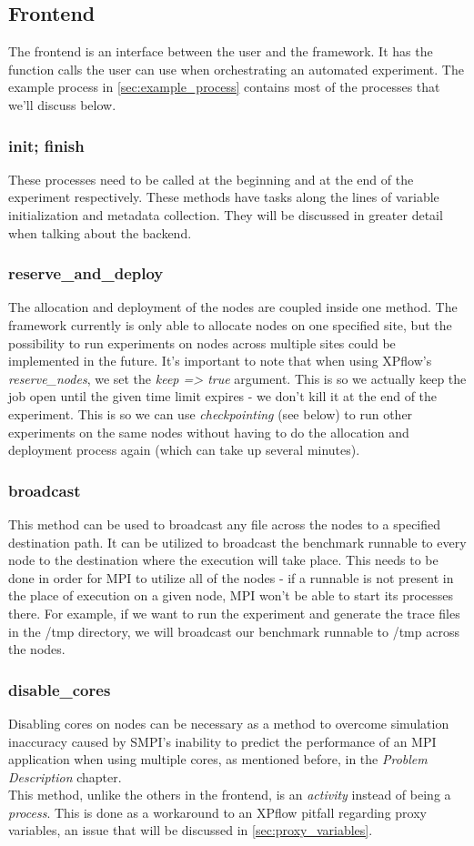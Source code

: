 \subsection{Frontend}
The frontend is an interface between the user and the framework. It
has the function calls the user can use when orchestrating an
automated experiment. The example process in \ref{sec:example_process}
contains most of the processes that we'll discuss below.
\subsubsection{init; finish}
These processes need to be called at the
beginning and at the end of the experiment respectively. These methods
have tasks along the lines of variable initialization and metadata
collection. They will be discussed in greater detail when talking
about the backend.
\label{sec:keeping_of_nodes}
\subsubsection{reserve\_and\_deploy}
The allocation and deployment of the nodes are coupled inside one
method. The framework currently is only able to allocate nodes on one
specified site, but the possibility to run experiments on nodes across
multiple
sites could be implemented in the future. It's important to note that
when using XPflow's \emph{reserve\_nodes}, we set the \emph{keep
  => true} argument. This is so we actually keep the job
open until the given time limit expires - we don't kill it at the end
of the experiment. This is so we can use \emph{checkpointing} (see
below) to run other experiments on the same nodes without having to do
the allocation and deployment process again (which can take up several
minutes).
\subsubsection{broadcast}
This method can be used to broadcast any file
across the nodes to a specified destination path. It can be utilized
to broadcast the benchmark runnable to every node to the destination
where the execution will take place. This needs to be done in order
for MPI to utilize all of the nodes - if a runnable is not present in
the place of execution on a given node, MPI won't be able to start its
processes there. For example, if we want to run the experiment and
generate the trace files in the /tmp directory, we will broadcast our
benchmark runnable to /tmp across the nodes.
\subsubsection{disable\_cores}
Disabling cores on nodes can be necessary
as a method to overcome simulation inaccuracy caused by SMPI's
inability to predict the performance of an MPI application when using
multiple cores, as mentioned before, in the \emph{Problem Description}
chapter.\\[0.3cm]
This method, unlike the others in the frontend, is an \emph{activity}
instead of being a \emph{process}. This is done as a workaround to an
XPflow pitfall regarding proxy variables, an issue that will be
discussed in \ref{sec:proxy_variables}.
